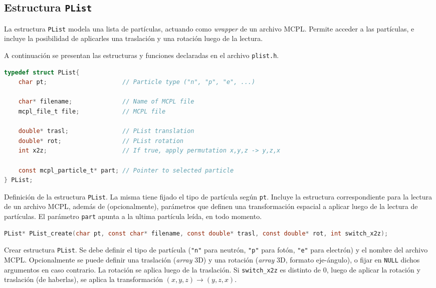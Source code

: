 \subsection{Estructura \texttt{PList}}

La estructura \verb|PList| modela una lista de partículas, actuando como \emph{wrapper} de un archivo MCPL. Permite acceder a las partículas, e incluye la posibilidad de aplicarles una traslación y una rotación luego de la lectura.

A continuación se presentan las estructuras y funciones declaradas en el archivo \verb|plist.h|.

\begin{footnotesize}

\begin{lstlisting}[language=C]
typedef struct PList{
	char pt;                     // Particle type ("n", "p", "e", ...)

	char* filename;              // Name of MCPL file
	mcpl_file_t file;            // MCPL file

	double* trasl;               // PList translation
	double* rot;                 // PList rotation
	int x2z;                     // If true, apply permutation x,y,z -> y,z,x

	const mcpl_particle_t* part; // Pointer to selected particle
} PList;
\end{lstlisting}
\begin{addmargin}[0.5cm]{0cm}
Definición de la estructura \verb|PList|. La misma tiene fijado el tipo de partícula según \verb|pt|. Incluye la estructura correspondiente para la lectura de un archivo MCPL, además de (opcionalmente), parámetros que definen una transformación espacial a aplicar luego de la lectura de partículas. El parámetro \verb|part| apunta a la ultima partícula leída, en todo momento.
\end{addmargin}

\begin{lstlisting}[language=C]
PList* PList_create(char pt, const char* filename, const double* trasl, const double* rot, int switch_x2z);
\end{lstlisting}
\begin{addmargin}[0.5cm]{0cm}
Crear estructura \verb|PList|. Se debe definir el tipo de partícula (\verb|"n"| para neutrón, \verb|"p"| para fotón, \verb|"e"| para electrón) y el nombre del archivo MCPL. Opcionalmente se puede definir una traslación (\emph{array} 3D) y una rotación (\emph{array} 3D, formato eje-ángulo), o fijar en \verb|NULL| dichos argumentos en caso contrario. La rotación se aplica luego de la traslación. Si \verb|switch_x2z| es distinto de 0, luego de aplicar la rotación y traslación (de haberlas), se aplica la transformación $(x,y,z)\rightarrow (y,z,x)$.
\end{addmargin}


\end{footnotesize}
